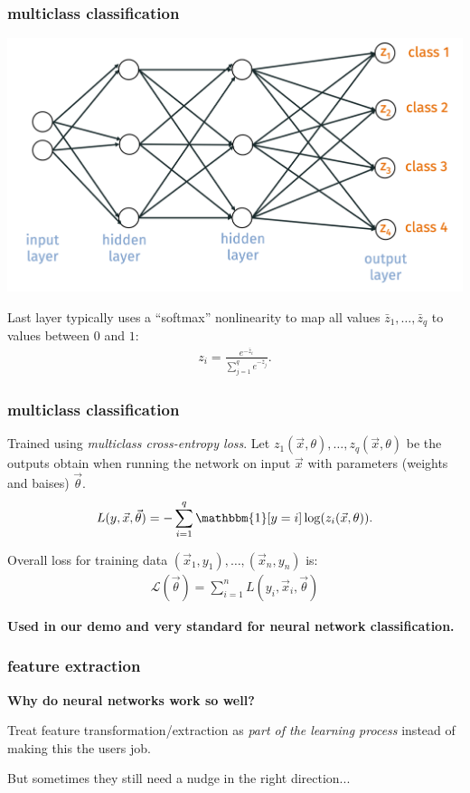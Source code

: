 \documentclass[handout,compress]{beamer}
\begin{document}
	\begin{frame}
	\frametitle{multiclass classification}
	\begin{center}
		\includegraphics[width=.8\textwidth]{multiclass_network.png}
	\end{center}
Last layer typically uses a ``softmax'' nonlinearity to map all values $\bar{z}_1, \ldots, \bar{z}_q$ to values between $0$ and $1$:
\begin{align*}
z_i = \frac{e^{-\bar{z}_i}}{\sum_{j=1}^q e^{-\bar{z}_j}}.
\end{align*}
	\end{frame}

	\begin{frame}
	\frametitle{multiclass classification}
	Trained using \emph{multiclass cross-entropy loss}. Let $z_1(\vec{x},\theta), \ldots, z_q(\vec{x},\theta)$ be the outputs obtain when running the network on input $\vec{x}$ with parameters (weights and baises) $\vec{\theta}$. 
	\begin{align*}
	L(y, \vec{x}, \vec{\theta}) = - \sum_{i=1}^q \mathbbm{1}[y = i] \log(z_i(\vec{x},\theta)).
	\end{align*}
	
	Overall loss for training data $(\vec{x}_1, y_1), \ldots, (\vec{x}_n, y_n)$ is:
	\begin{align*}
	\mathcal{L}(\vec{\theta}) = \sum_{i=1}^n L(y_i, \vec{x}_i, \vec{\theta})
	\end{align*}
	\begin{center}
		\alert{\textbf{Used in our demo and very standard for neural network classification.}}
	\end{center}
	\end{frame}

	\begin{frame}
	\frametitle{feature extraction}
	\begin{center}
	\textbf{Why do neural networks work so well?}
	\end{center}
	Treat feature transformation/extraction as \emph{part of the learning process} instead of making this the users job.
	
	But sometimes they still need a nudge in the right direction...
	\end{frame}
\end{document}
